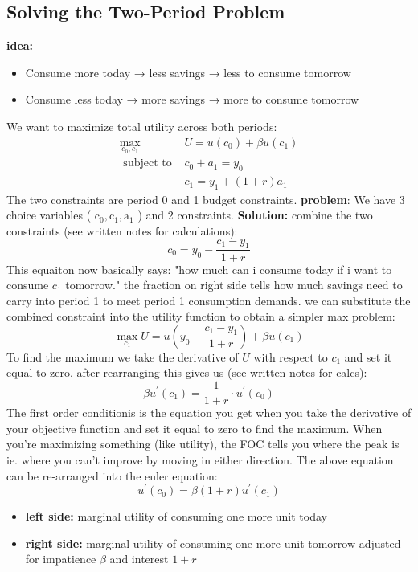 \documentclass[12pt]{article}
\begin{document}
\subsection{Solving the Two-Period Problem }
\textbf{idea:} 
\begin{itemize}
    \item Consume more today → less savings → less to consume tomorrow
    \item Consume less today → more savings → more to consume tomorrow
\end{itemize}
We want to maximize total utility across both periods:
$$
\begin{array}{rl}
\max _{c_0, c_1} & U=u\left(c_0\right)+\beta u\left(c_1\right) \\
\text { subject to } & c_0+a_1=y_0 \\
& c_1=y_1+(1+r) a_1
\end{array}
$$
The two constraints are period 0 and 1 budget constraints. \textbf{problem}: We have 3 choice variables ( $\mathrm{c}_0, \mathrm{c}_1, \mathrm{a}_1$ ) and 2 constraints. \textbf{Solution:} combine the two constraints (see written notes for calculations):
$$
c_0=y_0-\frac{c_1-y_1}{1+r}
$$
This equaiton now basically says: "how much can i consume today if i want to consume $c_1$ tomorrow." the fraction on right side tells how much savings need to carry into period 1 to meet period 1 consumption demands. we can substitute the combined constraint into the utility function to obtain a simpler max problem: 
$$
\max _{c_1} U=u\left(y_0-\frac{c_1-y_1}{1+r}\right)+\beta u\left(c_1\right)
$$
To find the maximum we take the derivative of $U$ with respect to $c_1$ and set it equal to zero. after rearranging this gives us (see written notes for calcs):
$$
\beta u^{\prime}\left(c_1\right)=\frac{1}{1+r} \cdot u^{\prime}\left(c_0\right)
$$
The first order conditionis is the equation you get when you take the derivative of your objective function and set it equal to zero to find the maximum. When you're maximizing something (like utility), the FOC tells you where the peak is ie. where you can't improve by moving in either direction. The above equation can be re-arranged into the euler equation: 
$$
u^{\prime}\left(c_0\right)=\beta(1+r) u^{\prime}\left(c_1\right)
$$
\begin{itemize}
    \item \textbf{left side:} marginal utility of consuming one more unit today
    \item \textbf{right side:} marginal utility of consuming one more unit tomorrow adjusted for impatience $\beta$ and interest $1+r$
\end{itemize}
\end{document}
